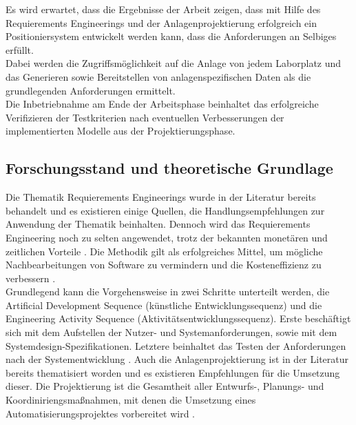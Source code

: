 \documentclass[../../Bachelorarbeit.tex]{subfiles}
\begin{document}
Es wird erwartet, dass die Ergebnisse der Arbeit zeigen, dass mit Hilfe des Requierements Engineerings und der Anlagenprojektierung erfolgreich ein Positioniersystem entwickelt werden kann, dass die Anforderungen an Selbiges erfüllt.\\
Dabei werden die Zugriffsmöglichkeit auf die Anlage von jedem Laborplatz und das Generieren sowie Bereitstellen von anlagenspezifischen Daten als die grundlegenden Anforderungen ermittelt.\\
Die Inbetriebnahme am Ende der Arbeitsphase beinhaltet das erfolgreiche Verifizieren der Testkriterien nach eventuellen Verbesserungen der implementierten Modelle aus der Projektierungsphase.

\subsection{Forschungsstand und theoretische Grundlage}
Die Thematik Requierements Engineerings wurde in der Literatur bereits behandelt und es existieren einige Quellen, die Handlungsempfehlungen zur Anwendung der Thematik beinhalten. Dennoch wird das Requierements Engineering noch zu selten angewendet, trotz der bekannten monetären und zeitlichen Vorteile \cite[xvii]{Laplante2014}. Die Methodik gilt als erfolgreiches Mittel, um mögliche Nachbearbeitungen von Software zu vermindern und die Kosteneffizienz zu verbessern \cite[1]{
Laplante2014}.\\
Grundlegend kann die Vorgehensweise in zwei Schritte unterteilt werden, die \glqq Artificial Development Sequence\grqq{} (künstliche Entwicklungssequenz) und die \glqq Engineering Activity Sequence\grqq{} (Aktivitätsentwicklungssequenz). Erste beschäftigt sich mit dem Aufstellen der Nutzer- und Systemanforderungen, sowie mit dem Systemdesign-Spezifikationen. Letztere beinhaltet das Testen der Anforderungen nach der Systementwicklung \cite[6]{
Laplante2014}.
Auch die Anlagenprojektierung ist in der Literatur bereits thematisiert worden und es existieren Empfehlungen für die Umsetzung dieser. Die Projektierung ist die Gesamtheit aller Entwurfs-, Planungs- und Koordiniriengsmaßnahmen, mit denen die Umsetzung eines Automatisierungsprojektes vorbereitet wird \cite[8]{Bindel2017}.\\
\end{document}
